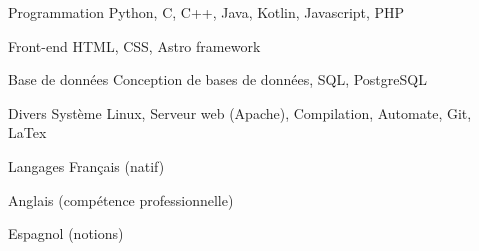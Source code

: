 

\begin{cvskills}
  \cvskill
    {Programmation} %
    {Python, C, C++, Java, Kotlin, Javascript, PHP} %

  \cvskill
  {Front-end} %
  {HTML, CSS, Astro framework} %

  \cvskill
    {Base de données} %
    {Conception de bases de données, SQL, PostgreSQL} %

  \cvskill
    {Divers} %
    {Système Linux, Serveur web (Apache), Compilation, Automate, Git, LaTex} %

  \cvskill
    {Langages} %
    {Français (natif)} %

  \cvskill
    {} %
    {Anglais (compétence professionnelle)} %

  \cvskill
    {} %
    {Espagnol (notions)} %


\end{cvskills}

